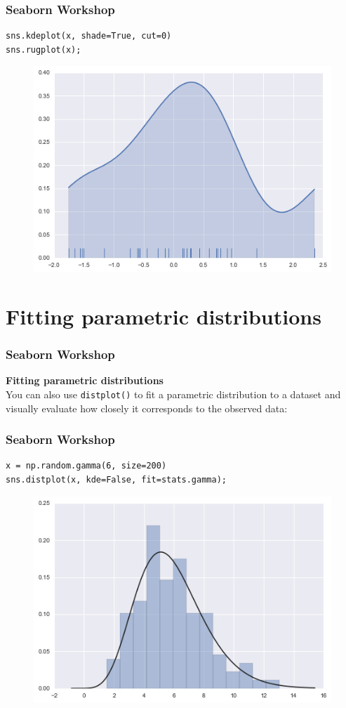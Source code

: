 \documentclass{beamer}
\begin{document}
\begin{frame}[fragile]
		\frametitle{Seaborn Workshop}
\begin{verbatim}
sns.kdeplot(x, shade=True, cut=0)
sns.rugplot(x);
\end{verbatim}

\begin{figure}
\centering
\includegraphics[width=0.7\linewidth]{images/distributions_24_0}
\end{figure}
\end{frame}
\section{Fitting parametric distributions}
\begin{frame}[fragile]
	\frametitle{Seaborn Workshop}
\noindent \textbf{Fitting parametric distributions}\\
You can also use \texttt{distplot()} to fit a parametric distribution to a dataset and visually evaluate how closely it corresponds to the observed data:

\end{frame}
\begin{frame}[fragile]
		\frametitle{Seaborn Workshop}
\begin{framed}
\begin{verbatim}
x = np.random.gamma(6, size=200)
sns.distplot(x, kde=False, fit=stats.gamma);
\end{verbatim}
\end{framed}

\begin{figure}
\centering
\includegraphics[width=0.7\linewidth]{images/distributions_26_0}
\caption{}
\label{fig:distributions_26_0}
\end{figure}
\end{frame}
\end{document}
